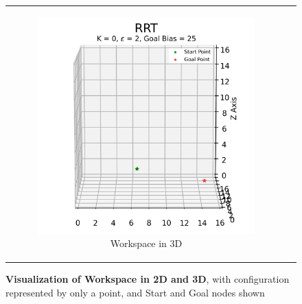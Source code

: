 \begin{figure}[H]
\begin{centering}
\begin{tabular}{cc}
    \begin{subfigure}{0.47\linewidth}
    \includegraphics[width=\linewidth]{chapters/chapter2/img/visualizing/workspace3d.png}
    \caption{Workspace in 3D}
    \end{subfigure} \\

\end{tabular}
\caption[Visualization of Workspace in 2D and 3D]{\textbf{Visualization of Workspace in 2D and 3D}, with configuration represented by only a point, and Start and Goal nodes shown}
\label{fig:rrt_workspace}
\end{centering}
\end{figure}